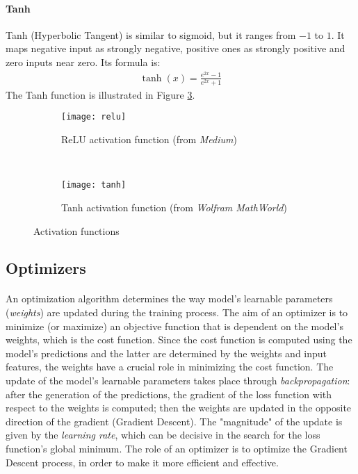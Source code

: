 \paragraph{Tanh} Tanh (Hyperbolic Tangent) is similar to sigmoid, but it ranges from $-1$ to $1$. It maps negative input as strongly negative, positive ones as strongly positive and zero inputs near zero. Its formula is:
\begin{align}
    \tanh{(x)} = \frac{e^{2x} - 1}{e^{2x} + 1}
\end{align}
The Tanh function is illustrated in Figure \ref{fig:tanh}.
\begin{figure}[htbp]
    \centering
    \begin{subfigure}[t]{0.5\textwidth}
		\texttt{[image: relu]}
        \caption{ReLU activation function (from \textit{Medium})}
        \label{fig:relu}
	\end{subfigure}%
	~
	\begin{subfigure}[t]{0.5\textwidth}
		\texttt{[image: tanh]}
        \caption{Tanh activation function (from \textit{Wolfram MathWorld})}
        \label{fig:tanh}
	\end{subfigure}
	\caption{Activation functions}
\end{figure}


\subsection{Optimizers}
\paragraph{} An optimization algorithm determines the way model's learnable parameters (\textit{weights}) are updated during the training process. The aim of an optimizer is to minimize (or maximize) an objective function that is dependent on the model's weights, which is the cost function. Since the cost function is computed using the model's predictions and the latter are determined by the weights and input features, the weights have a crucial role in minimizing the cost function. The update of the model's learnable parameters takes place through \textit{backpropagation}: after the generation of the predictions, the gradient of the loss function with respect to the weights is computed; then the weights are updated in the opposite direction of the gradient (Gradient Descent). The "magnitude" of the update is given by the \textit{learning rate}, which can be decisive in the search for the loss function's global minimum. The role of an optimizer is to optimize the Gradient Descent process, in order to make it more efficient and effective.

